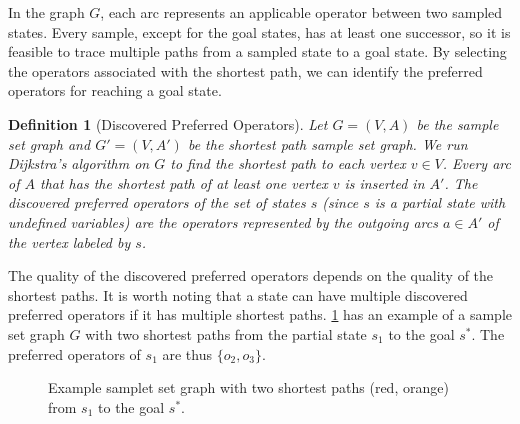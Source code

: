 \documentclass[ppgc,diss,english]{iiufrgs}
\newtheorem{definition}{Definition}
\begin{document}
In the graph $G$, each arc represents an applicable operator between two sampled states. Every sample, except for the goal states, has at least one successor, so it is feasible to trace multiple paths from a sampled state to a goal state. By selecting the operators associated with the shortest path, we can identify the preferred operators for reaching a goal state.

\begin{definition}[Discovered Preferred Operators]\label{def:discovered_preferred_operators}
Let $G = (V, A)$ be the sample set graph and $G' = (V, A')$ be the shortest path sample set graph. We run Dijkstra's algorithm on $G$ to find the shortest path to each vertex $v \in V$. Every arc of $A$ that has the shortest path of at least one vertex $v$ is inserted in $A'$. The discovered preferred operators of the set of states $s$ (since $s$ is a partial state with undefined variables) are the operators represented by the outgoing arcs $a \in A'$ of the vertex labeled by $s$.
\end{definition}

The quality of the discovered preferred operators depends on the quality of the shortest paths. It is worth noting that a state can have multiple discovered preferred operators if it has multiple shortest paths. \cref{fig:spg-example} has an example of a sample set graph $G$ with two shortest paths from the partial state $s_{1}$ to the goal $s^{*}$. The preferred operators of $s_{1}$ are thus $\{o_{2}, o_{3}\}$.

\begin{figure}[tb]
\caption[Example sample set graph with two shortest paths]{Example samplet set graph with two shortest paths (red, orange) from $s_{1}$ to the goal $s^{*}$.}
\centering
{}
\label{fig:spg-example}
\end{figure}
\end{document}
